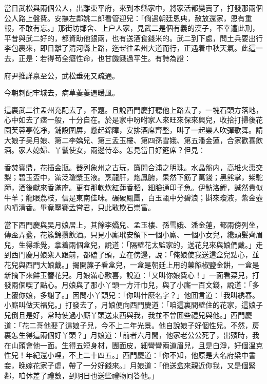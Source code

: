 當日武松與兩個公人，出離東平府，來到本縣家中，將家活都變賣了，打發那兩個公人路上盤費。安撫左鄰姚二郎看管迎兒：「倘遇朝廷恩典，赦放還家，恩有重報，不敢有忘。」那街坊鄰舍、上户人家，見武二是個有義的漢子，不幸遭此刑，平昔與武二好的，都資助他銀兩，也有送酒食錢米的。武二到下處，問土兵要出行李包裹來，即日離了清河縣上路，迤ぜ往孟州大道而行，正遇着中秋天氣。此這一去，正是：若得苟全癡性命，也甘饑餓過平生。有詩為證：

府尹推詳禀至公，武松垂死又疏通。

今朝刺配牢城去，病草萋萋遇暖風。

這裏武二往孟州充配去了，不題。且說西門慶打聽他上路去了，一塊石頭方落地，心中如去了痞一般，十分自在。於是家中吩咐家人來旺來保來興兒，收拾打掃後花園芙蓉亭乾凈，鋪設圍屏，懸起錦障，安排酒席齊整，叫了一起樂人吹彈歌舞。請大娘子吴月娘、第二李嬌兒、第三孟玉樓、第四孫雪娥、第五潘金蓮，合家歡喜飲酒。家人媳婦、丫鬟使女，兩邊侍奉。怎見當日好筵席？但見：

香焚寳鼎，花插金瓶。器列象州之古玩，簾開合浦之明珠。水晶盤内，高堆火棗交梨；碧玉盃中，滿泛瓊漿玉液。烹龍肝，炮鳳腑，果然下筯了萬錢；黑熊掌，紫駝蹄，酒後獻來香滿座。更有那軟炊紅蓮香稻，細膾通印子魚。伊魴洛鯉，誠然貴似牛羊；龍眼荔枝，信是東南佳味。碾破鳳團，白玉甌中分碧浪；斟來瓊液，紫金壺内噴清香。畢竟壓賽孟嘗君，只此敢欺石崇富。

當下西門慶與吴月娘居上，其餘李嬌兒、孟玉樓、孫雪娥、潘金蓮，都兩傍列坐，傳盃弄盞，花簇錦攢飲酒。只見小廝玳安領下一個小廝、一個小女兒，纔頭髮齊眉兒，生得乖覺，拿着兩個盒兒，說道：「隔壁花太監家的，送花兒來與娘們戴。」走到西門慶月娘衆人跟前，都磕了頭，立在傍邊，說：「俺娘使我送這盒兒點心，並花兒與西門大娘戴。」揭開簾子看盒兒，一盒是朝廷上用的菓餡椒鹽金餅，一盒是新摘下來鮮玉簪花兒。月娘滿心歡喜，說道：「又叫你娘費心！」一面看菜兒，打發兩個喫了點心。月娘與了那小丫頭一方汗巾兒，與了小廝一百文錢，說道：「多上覆你娘，多謝了。」因問小丫頭兒：「你叫什麽名字？」他囬言道：「我叫綉春。小廝叫做天福兒。」打發去了，月娘便向西門慶道：「咱這裏間壁住的花家，這娘子兒倒且是好，常時使過小廝丫頭送東西與我，我並不曾囬些禮兒與他。」西門慶道：「花二哥他娶了這娘子兒，今不上二年光景。他自說娘子好個性兒。不然，房裏怎生得這兩個好丫頭？」月娘道：「前者六月間，他家老公公死了，出殯時，我在山頭會他一面。生得五短身材，團面皮，細彎彎兩道眉兒，且是白淨，好個溫克性兒！年紀還小哩，不上二十四五。」西門慶道：「你不知，他原是大名府梁中書妾，晚嫁花家子虚，帶了一分好錢來。」月娘道：「他送盒來親近你我，又是個緊鄰，咱休差了禮數，到明日也送些禮物囘答他。」

